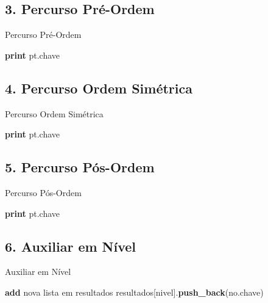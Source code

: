 \documentclass[a4paper,12pt]{article}
\begin{document}
\subsection*{3. Percurso Pré-Ordem}
\begin{algorithm}[H]
\caption{Percurso Pré-Ordem}
\begin{algorithmic}[1]
        \State \textbf{print} pt.chave
        \State {}
        \State {}
    \EndIf
\EndFunction
\end{algorithmic}
\end{algorithm}

\subsection*{4. Percurso Ordem Simétrica}
\begin{algorithm}[H]
\caption{Percurso Ordem Simétrica}
\begin{algorithmic}[1]
        \State {}
        \State \textbf{print} pt.chave
        \State {}
    \EndIf
\EndFunction
\end{algorithmic}
\end{algorithm}

\subsection*{5. Percurso Pós-Ordem}
\begin{algorithm}[H]
\caption{Percurso Pós-Ordem}
\begin{algorithmic}[1]
        \State {}
        \State {}
        \State \textbf{print} pt.chave
    \EndIf
\EndFunction
\end{algorithmic}
\end{algorithm}

\subsection*{6. Auxiliar em Nível}
\begin{algorithm}[H]
\caption{Auxiliar em Nível}
\begin{algorithmic}[1]
        \State \Return
    \EndIf
        \State \textbf{add} nova lista em resultados
    \EndIf
    \State resultados[nivel].\textbf{push\_back}(no.chave)
    \State {}
    \State {}
\EndFunction
\end{algorithmic}
\end{algorithm}
\end{document}
